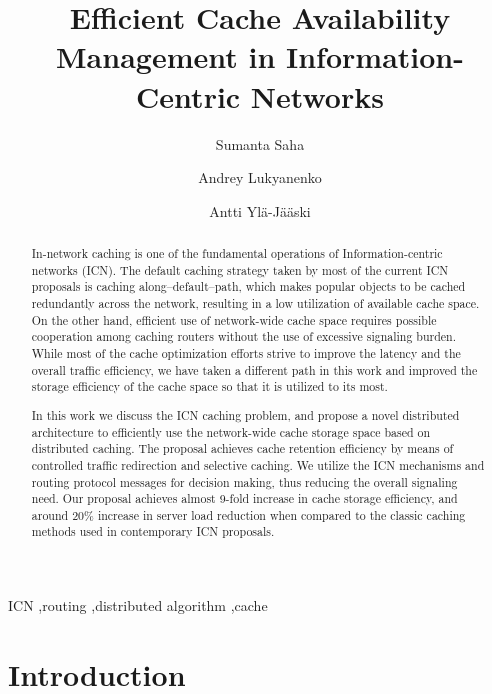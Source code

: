 \documentclass[article]{elsarticle}
\begin{document}
\begin{frontmatter}

\title{Efficient Cache Availability Management in Information-Centric Networks}
\author[cse-aalto]{Sumanta Saha}

\author[cse-aalto]{Andrey Lukyanenko}

\author[cse-aalto]{Antti Yl\"a-J\"a\"aski}


\address[cse-aalto]{Computer Science and Engineering, Aalto University, 02150 Espoo, Finland}

\begin{abstract}
In-network caching is one of the fundamental operations of Information-centric networks (ICN). The default caching strategy taken by most of the current ICN proposals is caching along--default--path, which makes popular objects to be cached redundantly across the network, resulting in a low utilization of available cache space. On the other hand, efficient use of network-wide cache space requires possible cooperation among caching routers without the use of excessive signaling burden. While most of the cache optimization efforts strive to improve the latency and the overall traffic efficiency, we have taken a different path in this work and improved the storage efficiency of the cache space so that it is utilized to its most.

In this work we discuss the ICN caching problem, and propose a novel distributed architecture to efficiently use the network-wide cache storage space based on distributed caching. The proposal achieves cache retention efficiency by means of controlled traffic redirection and selective caching. We utilize the ICN mechanisms and routing protocol messages for decision making, thus reducing the overall signaling need. Our proposal achieves almost 9-fold increase in cache storage efficiency, and around 20\% increase in server load reduction when compared to the classic caching methods used in contemporary ICN proposals.
\end{abstract}

\begin{keyword}
ICN \sep routing \sep distributed algorithm \sep cache
\end{keyword}

\end{frontmatter}


\section{Introduction}
\end{document}
